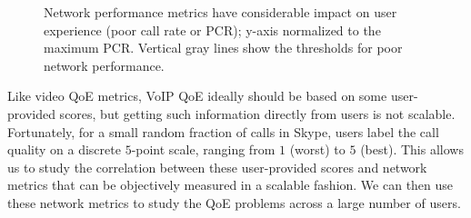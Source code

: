 \newcommand{\hybrid}{\textsc{Via}\xspace}
\newcommand{\Name}{Via\xspace}

\newcommand{\skype}{{Skype}\xspace}
\newcommand{\azure}{{ABC}\xspace}
\newcommand{\direct}{{default}\xspace}
\newcommand{\option}{{relaying option}\xspace}
\newcommand{\options}{{relaying options}\xspace}

\begin{figure}[t!]
\centering
{}
\caption{Network performance metrics have considerable 
impact on user experience (poor call rate or PCR); 
y-axis normalized to the maximum PCR. Vertical gray lines 
show the thresholds for poor network performance.}
\label{fig:pcr}
\end{figure}

Like video QoE metrics, VoIP QoE ideally should be based on some 
user-provided scores, but getting such information directly from users 
is not scalable.
Fortunately, for a small random fraction of calls in \skype, 
users label the call quality on a discrete $5$-point scale, 
ranging from $1$ 
(worst) to $5$ (best). This allows us to study the correlation
between these user-provided scores and network metrics that 
can be objectively measured in a scalable fashion. 
We can then use these network metrics to study the QoE 
problems across a large number of users.

